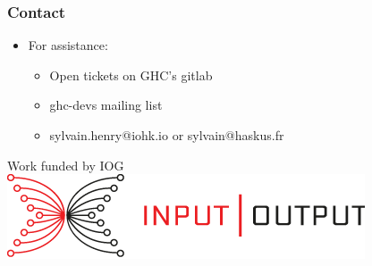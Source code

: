 \documentclass[aspectratio=169]{beamer}
\begin{document}
\begin{frame}
\frametitle{Contact}
  \begin{itemize}
    \item For assistance:
      \begin{itemize}
        \item Open tickets on GHC's gitlab
        \item ghc-devs mailing list
        \item sylvain.henry@iohk.io or sylvain@haskus.fr
      \end{itemize}
  \end{itemize}
  \vspace{2cm}
  \begin{center}
  Work funded by IOG\\\includegraphics[scale=0.3]{images/iohk-logo.png}
  \end{center}
\end{frame}
\end{document}
